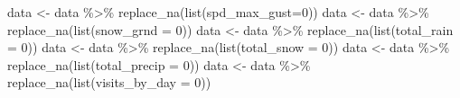 \documentclass[
]{article}
\newenvironment{Shaded}{\begin{snugshade}}{\end{snugshade}}
\newcommand{\AttributeTok}[1]{\textcolor[rgb]{0.77,0.63,0.00}{#1}}
\newcommand{\DecValTok}[1]{\textcolor[rgb]{0.00,0.00,0.81}{#1}}
\newcommand{\FunctionTok}[1]{\textcolor[rgb]{0.00,0.00,0.00}{#1}}
\newcommand{\NormalTok}[1]{#1}
\newcommand{\OtherTok}[1]{\textcolor[rgb]{0.56,0.35,0.01}{#1}}
\newcommand{\SpecialCharTok}[1]{\textcolor[rgb]{0.00,0.00,0.00}{#1}}
\begin{document}
\begin{Shaded}
\begin{Highlighting}[]
\NormalTok{data }\OtherTok{\textless{}{-}}\NormalTok{ data }\SpecialCharTok{\%\textgreater{}\%} \FunctionTok{replace\_na}\NormalTok{(}\FunctionTok{list}\NormalTok{(}\AttributeTok{spd\_max\_gust=}\DecValTok{0}\NormalTok{))}
\NormalTok{data }\OtherTok{\textless{}{-}}\NormalTok{ data }\SpecialCharTok{\%\textgreater{}\%} \FunctionTok{replace\_na}\NormalTok{(}\FunctionTok{list}\NormalTok{(}\AttributeTok{snow\_grnd =} \DecValTok{0}\NormalTok{))}
\NormalTok{data }\OtherTok{\textless{}{-}}\NormalTok{ data }\SpecialCharTok{\%\textgreater{}\%} \FunctionTok{replace\_na}\NormalTok{(}\FunctionTok{list}\NormalTok{(}\AttributeTok{total\_rain =} \DecValTok{0}\NormalTok{))}
\NormalTok{data }\OtherTok{\textless{}{-}}\NormalTok{ data }\SpecialCharTok{\%\textgreater{}\%} \FunctionTok{replace\_na}\NormalTok{(}\FunctionTok{list}\NormalTok{(}\AttributeTok{total\_snow =} \DecValTok{0}\NormalTok{))}
\NormalTok{data }\OtherTok{\textless{}{-}}\NormalTok{ data }\SpecialCharTok{\%\textgreater{}\%} \FunctionTok{replace\_na}\NormalTok{(}\FunctionTok{list}\NormalTok{(}\AttributeTok{total\_precip =} \DecValTok{0}\NormalTok{))}
\NormalTok{data }\OtherTok{\textless{}{-}}\NormalTok{ data }\SpecialCharTok{\%\textgreater{}\%} \FunctionTok{replace\_na}\NormalTok{(}\FunctionTok{list}\NormalTok{(}\AttributeTok{visits\_by\_day =} \DecValTok{0}\NormalTok{))}


\end{Highlighting}
\end{Shaded}
\end{document}
